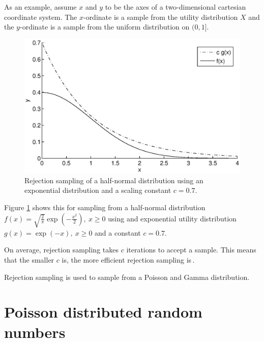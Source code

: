 \documentclass[a4paper]{scrartcl}
\begin{document}
As an example, assume $x$ and $y$ to be the axes of a two-dimensional cartesian coordinate system. The $x$-ordinate is a sample from the utility distribution $X$ and the $y$-ordinate is a sample from the uniform distribution on $(0, 1]$.

\begin{figure}
\centering
\includegraphics[width=1.0\textwidth]{figures/rejection_sampling.eps}
\caption[]{Rejection sampling of a half-normal distribution using an exponential distribution and a scaling constant $c = 0.7$.}
\label{app:fig:rejection_sampling}
\end{figure}

Figure \ref{app:fig:rejection_sampling} shows  this for sampling from a half-normal distribution $f(x) = \sqrt{\frac{2}{\pi}} \exp(-\frac{x^2}{2}),~ x \geq 0$ using and exponential utility distribution $g(x) = \exp(-x), ~x \geq 0$ and a constant $c = 0.7$.

On average, rejection sampling takes $c$ iterations to accept a sample. This means that the smaller $c$ is, the more efficient rejection sampling is\,\citep{Knuth1997b}.

Rejection sampling is used to sample from a Poisson and Gamma distribution.


\section*{Poisson distributed random numbers}
\end{document}
